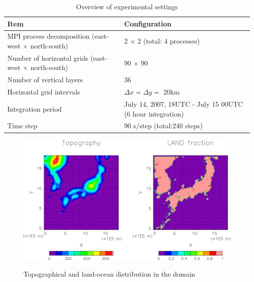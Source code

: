 \begin{table}[tb]
\begin{center}
  \caption{Overview of experimental settings}
  \label{tab:grids}
  \begin{tabularx}{150mm}{|l|X|} \hline
    \rowcolor[gray]{0.9} Item & Configuration \\ \hline
    MPI process decomposition (east-west $\times$ north-south) & 2 $\times$ 2 (total: 4 processes) \\ \hline
    Number of horizontal grids (east-west $\times$ north-south) & 90 $\times$ 90  \\ \hline
    Number of vertical layers   & 36                   \\ \hline
    Horizontal grid intervals   & $\Delta x  = \Delta y = $ 20km       \\ \hline
    Integration period & July 14, 2007, 18UTC - July 15 00UTC (6 hour integration) \\ \hline
    Time step & 90 s/step (total:240 steps) \\ \hline
  \end{tabularx}
\end{center}
\end{table}

\begin{figure}[tb]
\begin{center}
  \includegraphics[width=1.0\hsize]{./figure/real_domain.png}\\
  \caption{Topographical and land-ocean distribution in the domain}
  \label{fig:tutrial_real_domain}
\end{center}
\end{figure}


